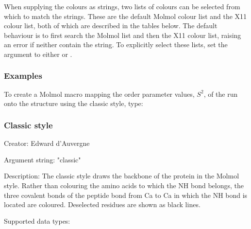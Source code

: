  When supplying the colours as strings, two lists of colours can be selected from which to match the strings.  These are the default Molmol colour list and the X11 colour list, both of which are described in the tables below.  The default behaviour is to first search the Molmol list and then the X11 colour list, raising an error if neither contain the string. To explicitly select these lists, set the  argument to either  or . 
  

  
 \subsubsection{Examples} 

 To create a Molmol macro mapping the order parameter values, $S^2$, of the run  onto the structure using the classic style, type: 
  




  
 \subsubsection{Classic style} 

 Creator:  Edward d'Auvergne 
  

 Argument string:  "classic" 
  

 Description:  The classic style draws the backbone of the protein in the Molmol  style.  Rather than colouring the amino acids to which the NH bond belongs, the three covalent bonds of the peptide bond from Ca to Ca in which the NH bond is located are coloured.  Deselected residues are shown as black lines. 
  

 Supported data types: 
  

